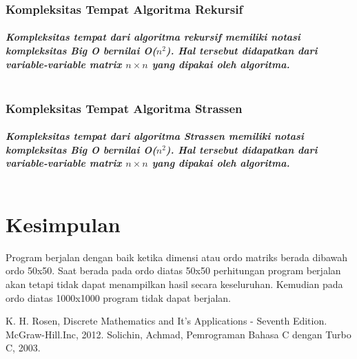 \documentclass[conference]{IEEEtran}
\begin{document}
\subsubsection{Kompleksitas Tempat Algoritma Rekursif}
\paragraph*{
    \emph{Kompleksitas tempat dari algoritma rekursif memiliki notasi kompleksitas Big O bernilai O($n^{2}$). 
    Hal tersebut didapatkan dari variable-variable matrix $n \times n$ yang dipakai oleh algoritma.\\\\}
}


\subsubsection{Kompleksitas Tempat Algoritma Strassen}
\paragraph*{
    \emph{Kompleksitas tempat dari algoritma Strassen memiliki notasi kompleksitas Big O bernilai O($n^{2}$). 
    Hal tersebut didapatkan dari variable-variable matrix $n \times n$ yang dipakai oleh algoritma.\\\\}
}



\section{Kesimpulan}
Program berjalan dengan baik ketika dimensi atau ordo matriks berada dibawah ordo 50x50. Saat berada pada ordo diatas 50x50 perhitungan program berjalan akan tetapi tidak dapat menampilkan hasil secara keseluruhan. Kemudian pada ordo diatas 1000x1000 program tidak dapat berjalan.

\begin{thebibliography}{00}
     K. H. Rosen, Discrete Mathematics and It’s Applications - Seventh
    Edition. McGraw-Hill.Inc, 2012.
     Solichin, Achmad, Pemrograman Bahasa C dengan Turbo C, 2003.
    \end{thebibliography}
\end{document}
